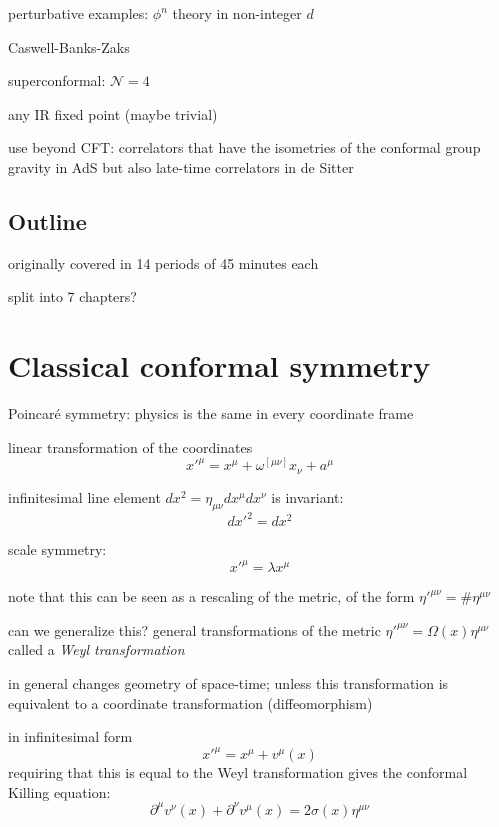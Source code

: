 \documentclass[a4paper,12pt]{article}
\numberwithin{equation}{section}
\begin{document}
perturbative examples: $\phi^n$ theory in non-integer $d$

Caswell-Banks-Zaks

superconformal: $\mathcal{N} = 4$


any IR fixed point (maybe trivial)


use beyond CFT:
correlators that have the isometries of the conformal group
gravity in AdS
but also late-time correlators in de Sitter

\subsection{Outline}

originally covered in 14 periods of 45 minutes each

split into 7 chapters?


\section{Classical conformal symmetry}


Poincar\'e symmetry: physics is the same in every coordinate frame

linear transformation of the coordinates
\begin{equation}
	x'^\mu = x^\mu + \omega^{[\mu\nu]} x_\nu + a^\mu
\end{equation}


infinitesimal line element $dx^2 = \eta_{\mu\nu} dx^\mu dx^\nu$ is invariant:
\begin{equation}
	dx'^2 = dx^2
\end{equation}


scale symmetry:
\begin{equation}
	x'^\mu = \lambda x^\mu
\end{equation}

note that this can be seen as a rescaling of the metric, of the form
$\eta'^{\mu\nu} = \# \eta^{\mu\nu}$


can we generalize this? general transformations of the metric $\eta'^{\mu\nu} = \Omega(x) \eta^{\mu\nu}$
called a \emph{Weyl transformation}

in general changes geometry of space-time; unless this transformation is equivalent to a coordinate transformation (diffeomorphism)

in infinitesimal form
\begin{equation}
	x'^\mu = x^\mu + v^\mu(x)
\end{equation}
requiring that this is equal to the Weyl transformation gives the conformal Killing equation:
\begin{equation}
	\partial^\mu v^\nu(x) + \partial^\nu v^\mu(x)
	= 2 \sigma(x) \eta^{\mu\nu}
\end{equation}
\end{document}
